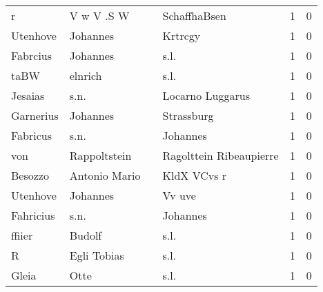 \documentclass[10pt,a4paper,landscape]{article}
\begin{document}
\begin{longtable}{llllrr}
                        r &                         V w V .S W &             &                                SchaffhaBsen &          1 &         0 \\
                 Utenhove &                           Johannes &             &                                     Krtrcgy &          1 &         0 \\
                 Fabrcius &                           Johannes &             &                                        s.l. &          1 &         0 \\
                     taBW &                            elnrich &             &                                        s.l. &          1 &         0 \\
                  Jesaias &                               s.n. &             &                            Locarno Luggarus &          1 &         0 \\
                Garnerius &                           Johannes &             &                                  Strassburg &          1 &         0 \\
                 Fabricus &                               s.n. &             &                                    Johannes &          1 &         0 \\
                      von &                       Rappoltstein &             &                     Ragolttein Ribeaupierre &          1 &         0 \\
                  Besozzo &                      Antonio Mario &             &                                 KldX VCvs r &          1 &         0 \\
                 Utenhove &                           Johannes &             &                                      Vv uve &          1 &         0 \\
                Fahricius &                               s.n. &             &                                    Johannes &          1 &         0 \\
                   ffiier &                             Budolf &             &                                        s.l. &          1 &         0 \\
                        R &                        Egli Tobias &             &                                        s.l. &          1 &         0 \\
                    Gleia &                               Otte &             &                                        s.l. &          1 &         0 \\

\end{longtable}
\end{document}
